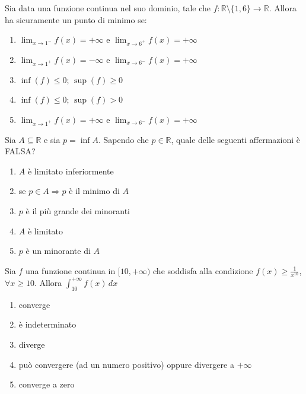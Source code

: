 \begin{quiz}
Sia data una funzione continua nel suo dominio, tale che $f:\mathbb R\setminus\{1,6\}\to\mathbb R$. Allora ha sicuramente un punto di minimo se:
\begin{enumerate}
\item $\lim_{x\to1^-}f(x)=+\infty$ e $\lim_{x\to6^+}f(x)=+\infty$
\item $\lim_{x\to1^+}f(x)=-\infty$ e $\lim_{x\to6^-}f(x)=+\infty$
\item $\inf(f)\leq0$; $\sup(f)\geq0$
\item $\inf(f)\leq0$; $\sup(f)>0$
\item $\lim_{x\to1^+}f(x)=+\infty$ e $\lim_{x\to6^-}f(x)=+\infty$
\end{enumerate}
\end{quiz}

\begin{quiz}
Sia $A\subseteq\mathbb R$ e sia $p=\inf A$. Sapendo che $p\in\mathbb R$, quale delle seguenti affermazioni \`e FALSA?
\begin{enumerate}
\item $A$ \`e limitato inferiormente
\item se $p\in A\Rightarrow p$ \`e il minimo di $A$
\item $p$ \`e il pi\`u grande dei minoranti
\item $A$ \`e limitato
\item $p$ \`e un minorante di $A$
\end{enumerate}
\end{quiz}

\begin{quiz}
Sia $f$ una funzione continua in $[10,+\infty)$ che soddisfa alla condizione $f(x)\geq\frac1{x^{10}}$, $\forall x\geq10$. Allora $\displaystyle\int_{10}^{+\infty}f(x)\,dx$
\begin{enumerate}
\item converge
\item \`e indeterminato
\item diverge
\item pu\`o convergere (ad un numero positivo) oppure divergere a $+\infty$
\item converge a zero
\end{enumerate}
\end{quiz}

